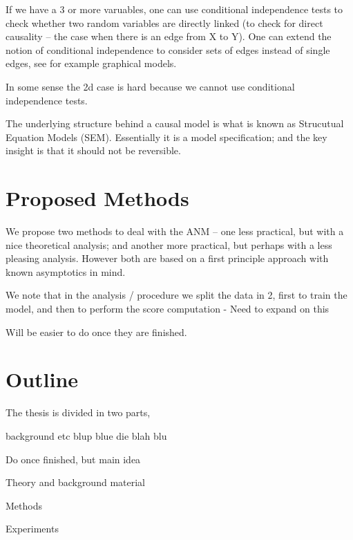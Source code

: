 If we have a 3 or more varuables, one can use conditional independence tests to check whether two random 
variables are directly linked (to check for direct causality -- the case when there is an edge from X to Y).
One can extend the notion of conditional independence to consider sets of edges instead of single edges, 
see for example graphical models.

In some sense the 2d case is hard because we cannot use conditional independence tests. 

The underlying structure behind a causal model is what is known as Strucutual Equation Models (SEM). Essentially 
it is a model specification; and the key insight is that it should not be reversible. 


\section{Proposed Methods}

We propose two methods to deal with the ANM -- one less practical, but with a nice theoretical
analysis; and another more practical, but perhaps with a less pleasing analysis. However both
are based on a first principle approach with known asymptotics in mind.

We note that in the analysis / procedure we split the data in 2, first to train the model, and
then to perform the score computation - Need to expand on this

Will be easier to do once they are finished.


\section{Outline}

The thesis is divided in two parts, 

background etc blup blue die blah blu

Do once finished, but main idea

Theory and background material

Methods

Experiments